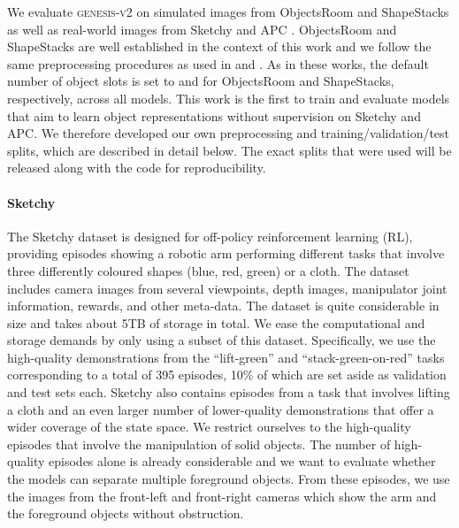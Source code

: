 \documentclass{article}
\begin{document}
We evaluate \textsc{genesis-v2} on simulated images from ObjectsRoom \cite{multiobjectdatasets19} and ShapeStacks \cite{groth2018shapestacks} as well as real-world images from Sketchy \cite{cabi2019scaling} and APC \cite{zeng2016multi}.
ObjectsRoom and ShapeStacks are well established in the context of this work and we follow the same preprocessing procedures as used in \citet{engelcke2020genesis} and \citet{engelcke2020reconstruction}.
As in these works, the default number of object slots is set to  and  for ObjectsRoom and ShapeStacks, respectively, across all models.
This work is the first to train and evaluate models that aim to learn object representations without supervision on Sketchy and APC.
We therefore developed our own preprocessing and training/validation/test splits, which are described in detail below.
The exact splits that were used will be released along with the code for reproducibility.

\paragraph{Sketchy}
The Sketchy dataset \citep{cabi2019scaling} is designed for off-policy reinforcement learning (RL), providing episodes showing a robotic arm performing different tasks that involve three differently coloured shapes (blue, red, green) or a cloth.
The dataset includes camera images from several viewpoints, depth images, manipulator joint information, rewards, and other meta-data.
The dataset is quite considerable in size and takes about 5TB of storage in total.
We ease the computational and storage demands by only using a subset of this dataset.
Specifically, we use the high-quality demonstrations from the ``lift-green'' and ``stack-green-on-red'' tasks corresponding to a total of 395 episodes, 10\% of which are set aside as validation and test sets each.
Sketchy also contains episodes from a task that involves lifting a cloth and an even larger number of lower-quality demonstrations that offer a wider coverage of the state space.
We restrict ourselves to the high-quality episodes that involve the manipulation of solid objects.
The number of high-quality episodes alone is already considerable and we want to evaluate whether the models can separate multiple foreground objects.
From these episodes, we use the images from the front-left and front-right cameras which show the arm and the foreground objects without obstruction.
\end{document}
